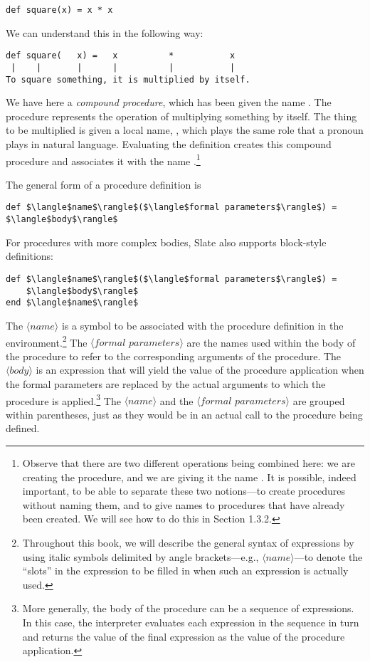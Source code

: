 \begin{lstlisting}
def square(x) = x * x
\end{lstlisting}

We can understand this in the following way:

\begin{verbatim}
def square(   x) =   x          *           x
 |    |       |      |          |           |
To square something, it is multiplied by itself.
\end{verbatim}

We have here a \textit{compound procedure}, which has been given the name . The procedure represents the operation of multiplying something by itself. The thing to be multiplied is given a local name, , which plays the same role that a pronoun plays in natural language. Evaluating the definition creates this compound procedure and associates it with the name .\footnote{Observe that there are two different operations being combined here: we are creating the procedure, and we are giving it the name . It is possible, indeed important, to be able to separate these two notions---to create procedures without naming them, and to give names to procedures that have already been created. We will see how to do this in Section 1.3.2.}

The general form of a procedure definition is

\begin{lstlisting}[style=plain]
def $\langle$name$\rangle$($\langle$formal parameters$\rangle$) = $\langle$body$\rangle$
\end{lstlisting}

For procedures with more complex bodies, Slate also supports block-style definitions:

\begin{lstlisting}[style=plain]
def $\langle$name$\rangle$($\langle$formal parameters$\rangle$) =
    $\langle$body$\rangle$
end $\langle$name$\rangle$
\end{lstlisting}

The $\langle\textit{name}\rangle$ is a symbol to be associated with the procedure definition in the environment.\footnote{Throughout this book, we will describe the general syntax of expressions by using italic symbols delimited by angle brackets---e.g., $\langle\textit{name}\rangle$---to denote the ``slots'' in the expression to be filled in when such an expression is actually used.} The $\langle\textit{formal parameters}\rangle$ are the names used within the body of the procedure to refer to the corresponding arguments of the procedure. The $\langle\textit{body}\rangle$ is an expression that will yield the value of the procedure application when the formal parameters are replaced by the actual arguments to which the procedure is applied.\footnote{More generally, the body of the procedure can be a sequence of expressions. In this case, the interpreter evaluates each expression in the sequence in turn and returns the value of the final expression as the value of the procedure application.} The $\langle\textit{name}\rangle$ and the $\langle\textit{formal parameters}\rangle$ are grouped within parentheses, just as they would be in an actual call to the procedure being defined.

